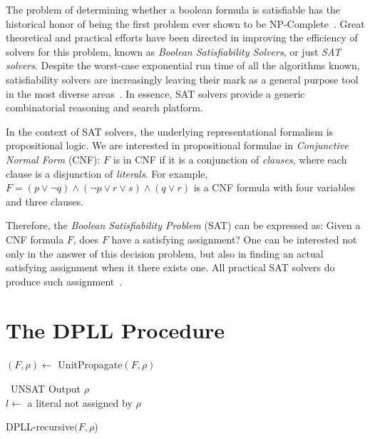 The problem of determining whether a boolean formula is satisfiable has the
historical honor of being the first problem ever shown to be
NP-Complete~\cite{Cook}. Great theoretical and practical efforts have been directed
in improving the efficiency of solvers for this problem, known as \emph{Boolean
Satisfiability Solvers}, or just \emph{SAT solvers}. Despite the worst-case
exponential run time of all the algorithms known, satisfiability solvers are
increasingly leaving their mark as a general purpose tool in the most diverse
areas~\cite{satchapter}. In essence, SAT solvers provide a generic combinatorial
reasoning and search platform. 

In the context of SAT solvers, the underlying representational formalism is
propositional logic. We are interested in propositional formulae in
\emph{Conjunctive Normal Form} (CNF): $F$ is in CNF if it is a conjunction of
\emph{clauses}, where each clause is a disjunction of \emph{literals}. For
example, $F = (p \lor \neg q) \land (\neg p \lor r \lor s) \land (q \lor r)$ is
a CNF formula with four variables and three clauses.

Therefore, the \emph{Boolean Satisfiability Problem} (SAT) can be expressed as:
Given a CNF formula $F$, does $F$ have a satisfying assignment? One can be
interested not only in the answer of this decision problem, but also in finding
an actual satisfying assignment when it there exists one. All practical SAT
solvers do produce such assignment~\cite{cormen}.

\section{The DPLL Procedure}
\label{sec:dpll}

\begin{algorithm}[!ht]
\label{alg:dpll}


    $(F, \rho) \leftarrow$ UnitPropagate$(F,\rho)$

    {\Return~UNSAT}
    {Output $\rho$\\
    }
    $l \leftarrow$ a literal not assigned by $\rho$

    {}
\caption{DPLL-recursive$(F, \rho$)}
\end{algorithm}

